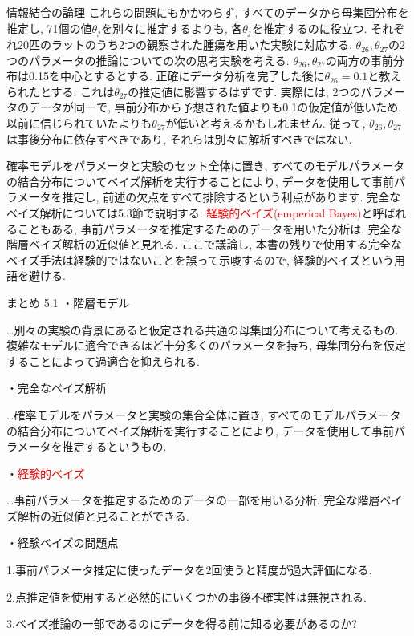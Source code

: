 \documentclass[10pt,dvipdfmx,a4]{beamer}
\newcommand{\tcr}[1]{\textcolor{red}{#1}}
\begin{document}
\begin{frame}{情報結合の論理}
これらの問題にもかかわらず, すべてのデータから母集団分布を推定し, 71個の値$\theta_j$を別々に推定するよりも, 各$\theta_j$を推定するのに役立つ.
それぞれ20匹のラットのうち2つの観察された腫瘍を用いた実験に対応する, $\theta_{26}, \theta_{27}$の2つのパラメータの推論についての次の思考実験を考える.
$\theta_{26}, \theta_{27}$の両方の事前分布は0.15を中心とするとする.
正確にデータ分析を完了した後に$\theta_{26}= 0.1$と教えられたとする.
これは$\theta_{27}$の推定値に影響するはずです.
実際には, 2つのパラメータのデータが同一で, 事前分布から予想された値よりも0.1の仮定値が低いため, 以前に信じられていたよりも$\theta_{27}$が低いと考えるかもしれません.
従って, $\theta_{26}, \theta_{27}$は事後分布に依存すべきであり, それらは別々に解析すべきではない.

確率モデルをパラメータと実験のセット全体に置き, すべてのモデルパラメータの結合分布についてベイズ解析を実行することにより, データを使用して事前パラメータを推定し, 前述の欠点をすべて排除するという利点があります.
完全なベイズ解析については5.3節で説明する.
\tcr{経験的ベイズ(emperical Bayes)}と呼ばれることもある, 事前パラメータを推定するためのデータを用いた分析は, 完全な階層ベイズ解析の近似値と見れる.
ここで議論し, 本書の残りで使用する完全なベイズ手法は経験的ではないことを誤って示唆するので, 経験的ベイズという用語を避ける.
\end{frame}


\begin{frame}[t]{まとめ 5.1}
・階層モデル

…別々の実験の背景にあると仮定される共通の母集団分布について考えるもの.
複雑なモデルに適合できるほど十分多くのパラメータを持ち, 母集団分布を仮定することによって過適合を抑えられる.

・完全なベイズ解析

…確率モデルをパラメータと実験の集合全体に置き, すべてのモデルパラメータの結合分布についてベイズ解析を実行することにより, データを使用して事前パラメータを推定するというもの.

・\tcr{経験的ベイズ}

…事前パラメータを推定するためのデータの一部を用いる分析.
完全な階層ベイズ解析の近似値と見ることができる.

・経験ベイズの問題点

1.事前パラメータ推定に使ったデータを2回使うと精度が過大評価になる.

2.点推定値を使用すると必然的にいくつかの事後不確実性は無視される.

3.ベイズ推論の一部であるのにデータを得る前に知る必要があるのか?
\end{frame}
\end{document}
